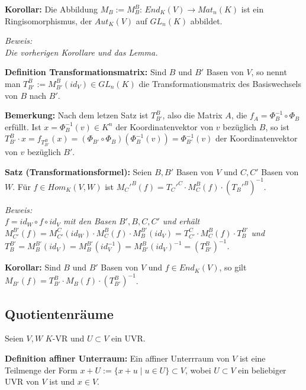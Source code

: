 \documentclass[11pt]{article}
\begin{document}
		\begin{framed}
			\textbf{Korollar:} Die Abbildung $M_B:=M_B^B$: $End_K(V)\to Mat_n(K)$ ist ein Ringisomorphismus, der $Aut_K(V)$ auf 
			$GL_n(K)$ abbildet.
		\end{framed}
		\textit{Beweis: \\
		Die vorherigen Korollare und das Lemma.} \\
		
		\begin{mdframed}[backgroundcolor=blue!20]
			\textbf{Definition Transformationsmatrix:} Sind $B$ und $B'$ Basen von $V$, so nennt man $T_{B'}^B:=M_{B'}^B(id_V)\in 
			GL_n(K)$ die Transformationsmatrix des Basiswechsels von $B$ nach $B'$.
		\end{mdframed}
		
		\textbf{Bemerkung:} Nach dem letzen Satz ist $T_{B'}^B$, also die Matrix $A$, die $f_A=\Phi_B^{-1}\circ \Phi_B$ 
		erfüllt. Ist $x=\Phi_B^{-1}(v)\in K^n$ der Koordinatenvektor von $v$ bezüglich $B$, so ist $T_{B'}^B\cdot 
		x=f_{T_{B'}^B}(x)=(\Phi_{B'}\circ \Phi_B)(\Phi_B^{-1}(v))=\Phi_{B'}^{-1}(v)$ der Koordinatenvektor von $v$ 
		bezüglich $B'$. \\
		
		\begin{framed}
			\textbf{Satz (Transformationsformel):} Seien $B,B'$ Basen von $V$ und $C,C'$ Basen von $W$. Für $f\in Hom_K(V,W)$ ist 
			$M_C'^B(f)=T_C'^C\cdot M_C^B(f)\cdot (T_B'^B)^{-1}$.
		\end{framed}
		\textit{Beweis: \\
		$f=id_W\circ f \circ id_V$ mit den Basen $B',B,C,C'$ und erhält $M_{C'}^{B'}(f)=M_{C'}^C(id_W)\cdot M_C^B(f)\cdot
		M_B^{B'}(id_V)=T_{C'}^C\cdot M_C^B(f)\cdot T_B^{B'}$ und $T_B^{B'}=M_B^{B'}(id_V)=M_B^{B'}(id_V^{-1})=M_{B'}^B(id_V)^
		{-1}=(T_{B'}^B)^{-1}$.} \\
		
		\begin{framed}
			\textbf{Korollar:} Sind $B$ und $B'$ Basen von $V$ und $f\in End_K(V)$, so gilt $M_{B'}(f)=T_{B'}^B \cdot M_B(f)
			\cdot (T_{B'}^B)^{-1}$.
		\end{framed}
		
	\subsection{Quotientenräume}
		Seien $V,W$ $K$-VR und $U\subset V$ ein UVR.
		
		\begin{mdframed}[backgroundcolor=blue!20]
			\textbf{Definition affiner Unterraum:} Ein affiner Unterrraum von $V$ ist eine Teilmenge der Form $x+U:=\{x+u\mid u \in U\}\subset 
			V$, wobei $U\subset V$ ein beliebiger UVR von $V$ ist und $x\in V$.
		\end{mdframed}
		
\end{document}
